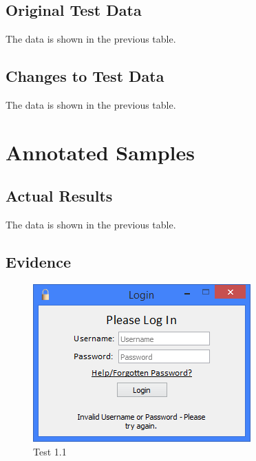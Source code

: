 \begin{landscape}
\subsection{Original Test Data}

The data is shown in the previous table.

\subsection{Changes to Test Data}

The data is shown in the previous table.

\section{Annotated Samples}

\subsection{Actual Results}

The data is shown in the previous table.

\subsection{Evidence}

\begin{figure}[H]
    \includegraphics[width=\textwidth]{./Testing/Evidence/LoginTestFail.png}
    \caption{Test 1.1}  \label{fig:LoginTestFail}
\end{figure}


\end{landscape}
